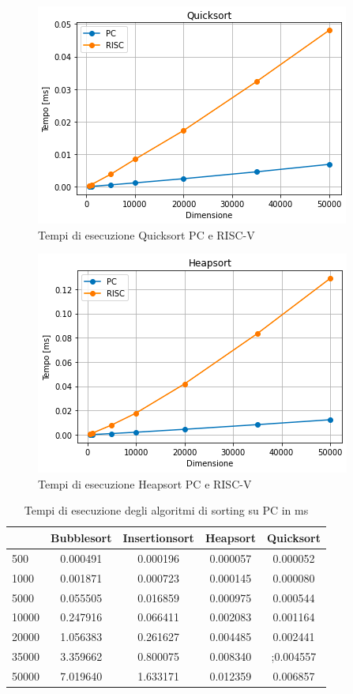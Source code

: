 \documentclass[12pt,a4paper]{report}
\begin{document}
\begin{figure}[ht]
\centering
         \includegraphics[scale=0.8]{Img/GraficiSorting/QuicksortPCRisc.PNG}
         \caption{Tempi di esecuzione Quicksort PC e RISC-V}
\end{figure}

\begin{figure}[ht]
\centering
         \includegraphics[scale=0.8]{Img/GraficiSorting/Heapsort_PC_RISC}
         \caption{Tempi di esecuzione Heapsort PC e RISC-V}
\end{figure}


	\begin{table}[ht]
		\centering
		\begin{tabular}		{| l | c | c | c | c |}
		\hline
		      & Bubblesort & Insertionsort & Heapsort & Quicksort \\ \hline
500   & 0.000491      & 0.000196      & 0.000057 & 0.000052     \\ \hline
1000  & 0.001871	    & 0.000723      & 0.000145 & 0.000080     \\ \hline
5000  & 0.055505      & 0.016859     & 0.000975  & 0.000544   \\ \hline
10000 & 0.247916      & 0.066411     & 0.002083 & 0.001164     \\ \hline
20000 & 1.056383   & 0.261627      & 0.004485  & 0.002441   \\ \hline
35000 & 3.359662     & 0.800075     & 0.008340  & ;0.004557   \\ \hline
50000 & 7.019640     & 1.633171   & 0.012359  & 0.006857  \\ \hline

		\end{tabular}
		\caption{Tempi di esecuzione degli algoritmi di sorting su PC in ms}
		\label{Fig:PcSort}
	\end{table}
\end{document}
